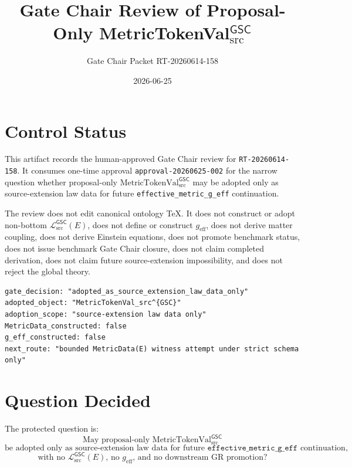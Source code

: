 \documentclass[11pt]{article}
\title{Gate Chair Review of Proposal-Only MetricTokenVal\(_{\mathrm{src}}^{\mathsf{GSC}}\)}
\author{Gate Chair Packet RT-20260614-158}
\date{2026-06-25}
\newcommand{\MetricTokenVal}{\mathrm{MetricTokenVal}_{\mathrm{src}}^{\mathsf{GSC}}}
\newcommand{\MetricData}{\mathcal{L}_{\mathrm{src}}^{\mathsf{GSC}}}
\newcommand{\geff}{g_{\mathrm{eff}}}
\begin{document}
\maketitle

\section{Control Status}

This artifact records the human-approved Gate Chair review for
\texttt{RT-20260614-158}. It consumes one-time approval
\texttt{approval-20260625-002} for the narrow question whether proposal-only
\(\MetricTokenVal\) may be adopted only as source-extension law data for
future \texttt{effective\_metric\_g\_eff} continuation.

The review does not edit canonical ontology TeX. It does not construct or
adopt non-bottom \(\MetricData(E)\), does not define or construct \(\geff\),
does not derive matter coupling, does not derive Einstein equations, does not
promote benchmark status, does not issue benchmark Gate Chair closure, does
not claim completed derivation, does not claim future source-extension
impossibility, and does not reject the global theory.

\begin{verbatim}
gate_decision: "adopted_as_source_extension_law_data_only"
adopted_object: "MetricTokenVal_src^{GSC}"
adoption_scope: "source-extension law data only"
MetricData_constructed: false
g_eff_constructed: false
next_route: "bounded MetricData(E) witness attempt under strict schema only"
\end{verbatim}

\section{Question Decided}

The protected question is:
\[
\text{May proposal-only }\MetricTokenVal
\]
\[
\text{be adopted only as source-extension law data for future }
\texttt{effective\_metric\_g\_eff}\text{ continuation,}
\]
\[
\text{with no }\MetricData(E)\text{, no }\geff\text{, and no downstream GR promotion?}
\]
\end{document}
